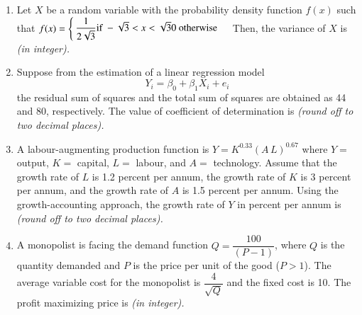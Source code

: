 \documentclass[12pt]{article}
\theoremstyle{remark}
\begin{document}
\begin{enumerate}
\hfill{}
\item Let $X$ be a random variable with the probability density function $f(x)$ such that 
\hspace{1cm} $f(x) = \begin{cases} 
\dfrac{1}{2\sqrt{3}}  \text{if } -\sqrt{3} < x < \sqrt{3} \newline
\text{$0$ otherwise}
\end{cases}$ \newline
Then, the variance of $X$ is \underline{\hspace{2cm}} \textit{(in integer).} 
\newline
\hfill{}
\item  Suppose from the estimation of a linear regression model 
$$Y_i = \beta_0 + \beta_1 X_i + e_i$$
the residual sum of squares and the total sum of squares are obtained as 44 and 80, respectively. \newline
The value of coefficient of determination is \underline{\hspace{2cm}} \textit{(round off to two decimal places).} 
\newline

\hfill{}
\item  A labour-augmenting production function is 
\hspace{1cm} $Y = K^{0.33}(A \, L)^{0.67}$ \newline
where $Y =$ output, $K =$ capital, $L =$ labour, and $A =$ technology. \newline
Assume that the growth rate of $L$ is 1.2 percent per annum, the growth rate of $K$ is 3 percent per annum, and the growth rate of $A$ is 1.5 percent per annum. \newline Using the growth-accounting approach, the growth rate of $Y$ in percent per annum is \underline{\hspace{2cm}} \textit{(round off to two decimal places).} 
\newline

\hfill{}
\item  A monopolist is facing the demand function $Q = \dfrac{100}{(P - 1)}$, where $Q$ is the quantity demanded and $P$ is the price per unit of the good ($P > 1$). The average variable cost for the monopolist is $\dfrac{4}{\sqrt{Q}}$ and the fixed cost is 10. The profit maximizing price is \underline{\hspace{2cm}} \textit{(in integer).} 
\end{enumerate}
\hfill{}
\end{document}
